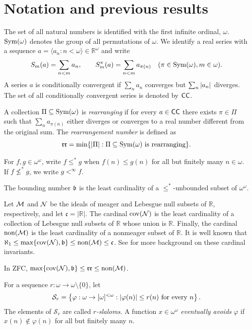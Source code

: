 \section{Notation and previous results}\label{sec:preliminaries}

The set of all natural numbers is identified with the first infinite ordinal, $\omega$.
$\operatorname{Sym}(\omega)$ denotes the group of all permutations of $\omega$.
We identify a real series with a sequence
$a=\langle a_n:n<\omega\rangle\in\mathbb R^\omega$ and write
\[
 S_m(a)=\sum_{n<m}a_n,
 \qquad
 S_m^\pi(a)=\sum_{n<m}a_{\pi(n)}
 \quad(\pi\in\operatorname{Sym}(\omega), m \in \omega).
\]
A series $a$ is conditionally convergent if $\sum_n a_n$ converges but
$\sum_n\left| a_n\right|$ diverges.
The set of all conditionally convergent series is denoted by $\mathsf{CC}$.

\begin{definition}\label{def:rr}
A collection $\Pi\subseteq\operatorname{Sym}(\omega)$ is \emph{rearranging} if for every
$a\in\mathsf{CC}$ there exists $\pi\in\Pi$ such that
$\sum_n a_{\pi(n)}$ either diverges or converges to a real number different
from the original sum.  The \emph{rearrangement number} is defined as
\[
      \mathfrak{rr}=\min\{\left| \Pi\right|:\Pi\subseteq\operatorname{Sym}(\omega)
      \text{ is rearranging}\}.
\]
\end{definition}


For
$f,g\in\omega^\omega$, write $f\leq^*g$ when
$f(n)\leq g(n)$ for all but finitely many $n\in \omega$.
If $f\not \leq^*g$, we write $g<^\infty f$.


The bounding number
$\mathfrak b$ is the least cardinality of a $\leq^*$-unbounded subset of
$\omega^\omega$.

Let $\mathcal M$ and $\mathcal N$ be the ideals of meager and Lebesgue null subsets
of $\mathbb R$, respectively, and let $\mathfrak c=|\mathbb R|$.
The cardinal $\operatorname{cov}(\mathcal N)$ is the least cardinality of a collection of Lebesgue null subsets of $\mathbb R$ whose union is $\mathbb R$.
Finally, the cardinal $\operatorname{non}(\mathcal M)$ is the least cardinality of a nonmeager subset of $\mathbb R$.
It is well known that $\aleph_1\leq \max\{\operatorname{cov}(\mathcal N),\mathfrak b\}\leq\operatorname{non}(\mathcal M)\leq \mathfrak c$.
See \cite{BlassHandbook} for more
background on these cardinal invariants.

\begin{theorem}
\label{thm:known-sandwich}
In ZFC, $\max\{\operatorname{cov}(\mathcal N),\mathfrak b\}\leq\mathfrak{rr}\leq\operatorname{non}(\mathcal M)$.
\end{theorem}
For a sequence $r:\omega\to\omega\setminus\{0\}$, let
\[
 {\mathcal S}_r=\left\{\varphi:\omega\to[\omega]^{<\omega}:
                         \left| \varphi(n)\right|\leq r(n)\text{ for every }n\right\}.
\]
The elements of ${\mathcal S}_r$ are called \emph{$r$-slaloms}. A function
$x\in\omega^\omega$ \emph{eventually avoids} $\varphi$ if
$x(n)\notin\varphi(n)$ for all but finitely many $n$.

